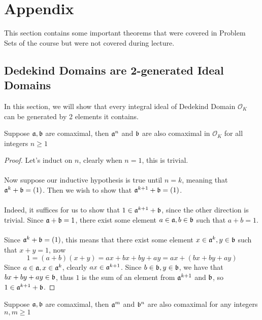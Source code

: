 \section{Appendix}
This section contains some important theorems that were covered in Problem Sets of the course but were not covered during lecture.

\subsection{Dedekind Domains are 2-generated Ideal Domains}

In this section, we will show that every integral ideal of Dedekind Domain $\mathcal{O}_K$ can be generated by 2 elements it contains.

\begin{lemma}
Suppose $\mathfrak{a}, \mathfrak{b}$ are comaximal, then $\mathfrak{a}^n$ and $\mathfrak{b}$ are also comaximal in $\mathcal{O}_K$ for all integers $n \geq 1$
\end{lemma}

\begin{proof}
Let's induct on $n$, clearly when $n = 1$, this is trivial.\\\\
Now suppose our inductive hypothesis is true until $n = k$, meaning that $\mathfrak{a}^k + \mathfrak{b} = (1)$. Then we wish to show that $\mathfrak{a}^{k+1} + \mathfrak{b} = (1)$.\\\\
Indeed, it suffices for us to show that $1 \in \mathfrak{a}^{k+1} + \mathfrak{b}$, since the other direction is trivial. Since $\mathfrak{a} + \mathfrak{b} = 1$, there exist some element $a \in \mathfrak{a}, b \in \mathfrak{b}$ such that $a + b = 1$.\\\\
Since $\mathfrak{a}^{k} + \mathfrak{b} = (1)$, this means that there exist some element $x \in \mathfrak{a}^k, y \in \mathfrak{b}$ such that $x + y = 1$, now
\[1 = (a + b)(x + y) = ax + bx + by + ay = ax + (bx + by + ay)\]
Since $a \in \mathfrak{a}, x \in \mathfrak{a}^{k}$, clearly $ax \in \mathfrak{a}^{k+1}$. Since $b \in \mathfrak{b}, y \in \mathfrak{b}$, we have that $bx + by + ay \in \mathfrak{b}$, thus $1$ is the sum of an element from $\mathfrak{a}^{k+1}$ and $\mathfrak{b}$, so $1 \in \mathfrak{a}^{k+1} + \mathfrak{b}$.
\end{proof}

\begin{corollary}
Suppose $\mathfrak{a}, \mathfrak{b}$ are comaximal, then $\mathfrak{a}^m$ and $\mathfrak{b}^n$ are also comaximal for any integers $n, m \geq 1$
\end{corollary}

